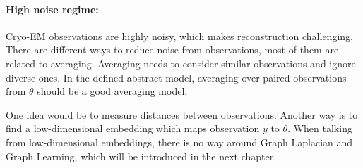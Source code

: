 \paragraph{High noise regime:}
Cryo-EM observations are highly noisy, which makes reconstruction challenging. 
There are different ways to reduce noise from observations, most of them are related to averaging. 
Averaging needs to consider similar observations and ignore diverse ones. 
In the defined abstract model, averaging over paired observations from $\theta$ should be a good averaging model.

One idea would be to measure distances between observations.
Another way is to find a low-dimensional embedding which maps observation $y$ to $\theta$.
When talking from low-dimensional embeddings, there is no way around Graph Laplacian and Graph Learning,
which will be introduced in the next chapter.
